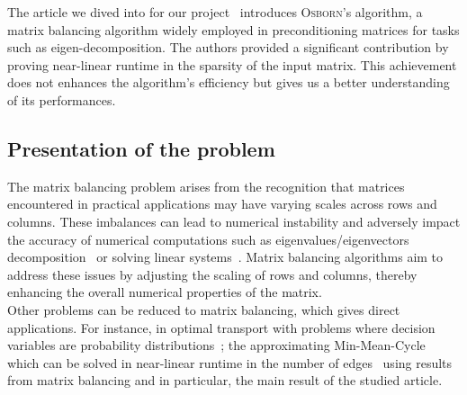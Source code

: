 The article we dived into for our project~\cite{altschuler2023near} introduces \textsc{Osborn}'s algorithm, a matrix balancing algorithm widely employed in preconditioning matrices for tasks such as eigen-decomposition. The authors provided a significant contribution by proving near-linear runtime in the sparsity of the input matrix. This achievement does not enhances the algorithm's efficiency but gives us a better understanding of its performances.

\subsection{Presentation of the problem}

The matrix balancing problem arises from the recognition that matrices encountered in practical applications may have varying scales across rows and columns. These imbalances can lead to numerical instability and adversely impact the accuracy of numerical computations such as eigenvalues/eigenvectors decomposition~\cite{chen2000balancing, chen2001preconditioning} or solving linear systems~\cite{chen2001preconditioning}. Matrix balancing algorithms aim to address these issues by adjusting the scaling of rows and columns, thereby enhancing the overall numerical properties of the matrix.\\

Other problems can be reduced to matrix balancing, which gives direct applications. For instance, in optimal transport with problems where decision variables are probability distributions~\cite{altschuler2022transport}; the approximating Min-Mean-Cycle which can be solved in near-linear runtime in the number of edges~\cite{altschuler2022approximating} using results from matrix balancing and in particular, the main result of the studied article. 



